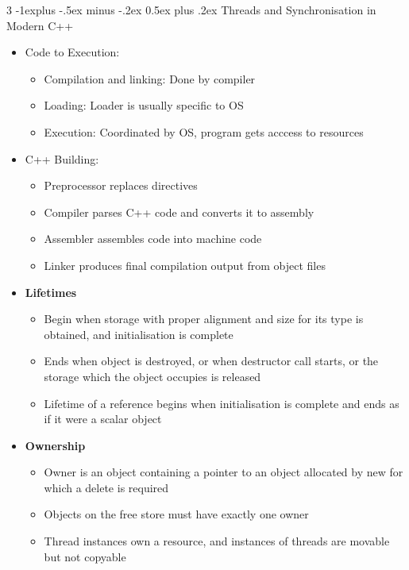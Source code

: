 \documentclass[10pt, landscape]{article}
\makeatletter
\renewcommand{\section}{\@startsection{section}{1}{0mm}%
                                {-1ex plus -.5ex minus -.2ex}%
                                {0.5ex plus .2ex}%
                                {\normalfont\large\bfseries}}
\renewcommand{\section}{\@startsection{section}{2}{0mm}%
                                {-1explus -.5ex minus -.2ex}%
                                {0.5ex plus .2ex}%
                                {\normalfont\normalsize\bfseries}}
\makeatother
\begin{document}
\begin{multicols*}{3}
\section{Threads and Synchronisation in Modern C++}
\begin{itemize}
    \item Code to Execution:
    \begin{itemize}
        \item Compilation and linking: Done by compiler
        \item Loading: Loader is usually specific to OS
        \item Execution: Coordinated by OS, program gets acccess to resources
    \end{itemize}
    \item C++ Building:
    \begin{itemize}
        \item Preprocessor replaces directives
        \item Compiler parses C++ code and converts it to assembly
        \item Assembler assembles code into machine code
        \item Linker produces final compilation output from object files
    \end{itemize}
    \item \textbf{Lifetimes}
    \begin{itemize}
        \item Begin when storage with proper alignment and size for its type is obtained, and initialisation is complete
        \item Ends when object is destroyed, or when destructor call starts, or the storage which the object occupies is released
        \item Lifetime of a reference begins when initialisation is complete and ends as if it were a scalar object
    \end{itemize}
    \item \textbf{Ownership}
    \begin{itemize}
        \item Owner is an object containing a pointer to an object allocated by new for which a delete is required
        \item Objects on the free store must have exactly one owner
        \item Thread instances own a resource, and instances of threads are movable but not copyable
    \end{itemize}

\end{itemize}
\end{multicols*}
\end{document}
